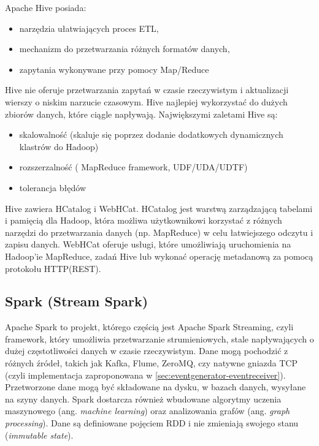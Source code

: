 Apache Hive posiada:

\begin{itemize}[noitemsep]
\item narzędzia ułatwiających proces ETL,
\item mechanizm do przetwarzania różnych formatów danych,
\item zapytania wykonywane przy pomocy Map/Reduce
\end{itemize}

Hive nie oferuje przetwarzania zapytań w czasie rzeczywistym i aktualizacji wierszy o niskim narzucie czasowym. Hive najlepiej wykorzystać do dużych zbiorów danych, które ciągle napływają. Największymi zaletami Hive są:

\begin{itemize}[noitemsep]
\item skalowalność (skaluje się poprzez dodanie dodatkowych dynamicznych klastrów do Hadoop)
\item rozszerzalność ( MapReduce framework, UDF/UDA/UDTF)
\item tolerancja błędów
\end{itemize}

Hive zawiera HCatalog i WebHCat. HCatalog jest warstwą zarządzającą tabelami i pamięcią dla Hadoop, która możliwa użytkownikowi korzystać z różnych narzędzi do przetwarzania danych (np. MapReduce) w celu łatwiejszego odczytu i zapisu danych. WebHCat oferuje usługi, które umożliwiają uruchomienia na Hadoop'ie MapReduce, zadań Hive lub wykonać operację metadanową za pomocą protokołu HTTP(REST).

\subsection{Spark (Stream Spark)}
\label{sec:solutions:spark}

Apache Spark to projekt, którego częścią jest Apache Spark Streaming, czyli framework, który umożliwia przetwarzanie strumieniowych, stale napływających o dużej częstotliwości danych w czasie rzeczywistym. Dane mogą pochodzić z różnych źródeł, takich jak Kafka, Flume, ZeroMQ, czy natywne gniazda TCP (czyli implementacja zaproponowana w \ref{sec:eventgenerator-eventreceiver}). Przetworzone dane mogą być składowane na dysku, w bazach danych, wysyłane na szyny danych. Spark dostarcza również wbudowane algorytmy uczenia maszynowego (ang. \emph{machine learning}) oraz analizowania grafów (ang. \emph{graph processing}). Dane są definiowane pojęciem RDD\cite{manual-apache-spark-streaming} i nie zmieniają swojego stanu (\emph{immutable state}).

